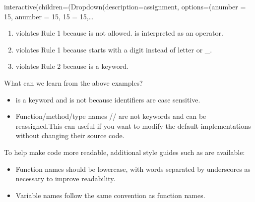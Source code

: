 \documentclass[letterpaper,10pt,english]{sphinxmanual}
\begin{document}
\begin{sphinxVerbatim}[commandchars=\\\{\}]
interactive(children=(Dropdown(description=\PYGZsq{}assignment\PYGZsq{}, options=(\PYGZsq{}a\PYGZhy{}number = 15\PYGZsq{}, \PYGZsq{}a\PYGZus{}number = 15\PYGZsq{}, \PYGZsq{}15 = 15\PYGZsq{},…
\end{sphinxVerbatim}
\begin{enumerate}
%
\item {} 
 violates Rule 1 because \sphinxcode{\sphinxupquote{\sphinxhyphen{}}} is not allowed. \sphinxcode{\sphinxupquote{\sphinxhyphen{}}} is interpreted as an operator.

\item {} 
 violates Rule 1 because  starts with a digit instead of letter or \_.

\item {} 
 violates Rule 2 because  is a keyword.

\end{enumerate}

What can we learn from the above examples?
\begin{itemize}
\item {} 
 is a keyword and  is not because identifiers are case sensitive.

\item {} 
Function/method/type names // are not keywords and can be reassigned.This can useful if you want to modify the default implementations without changing their source code.

\end{itemize}

To help make code more readable, additional style guides such as  are available:
\begin{itemize}
\item {} 
Function names should be lowercase, with words separated by underscores as necessary to improve readability.

\item {} 
Variable names follow the same convention as function names.

\end{itemize}
\end{document}

